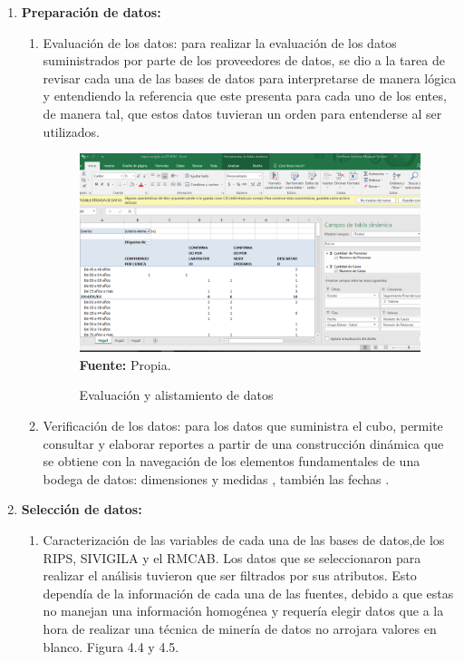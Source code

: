 \documentclass[a4paper,openright,12pt]{book}
\theoremstyle{definition}
\theoremstyle{remark}
\begin{document}
\begin{enumerate}
	\item \textbf{Preparación de datos:}
    \begin{enumerate}
		\item Evaluación de los datos: para realizar la evaluación de los datos suministrados por parte de los proveedores de datos, se  dio a la tarea de revisar cada una de las bases de datos para interpretarse de manera lógica y entendiendo la referencia que este presenta para cada uno de los entes,  de manera tal, que  estos datos tuvieran un orden para entenderse al ser utilizados.

\begin{figure}[ht]
\centering
\caption{Evaluación y alistamiento de datos} 
\includegraphics[scale=0.3]{DatoCsv}
\label{fig:1_OpenSSL}
\\ \textbf{Fuente:} Propia.
\end{figure}

    	\item Verificación de los datos: para los datos que suministra el cubo, permite consultar y elaborar reportes a partir de una construcción dinámica que se obtiene con la navegación de los elementos fundamentales de una bodega de datos: dimensiones y medidas , también las fechas .
	\end{enumerate}
    \item \textbf{Selección de datos:}
    \begin{enumerate}
		\item Caracterización de  las variables de cada una de las bases de datos,de los RIPS, SIVIGILA y el RMCAB. Los datos que se seleccionaron para realizar el análisis tuvieron que ser filtrados por sus atributos. Esto dependía de la información  de cada una de las fuentes, debido a que estas no manejan una información homogénea y requería elegir datos que a la hora de realizar una técnica de minería de datos no arrojara valores en blanco. Figura 4.4 y 4.5.



\end{enumerate}
\end{enumerate}
\end{document}
